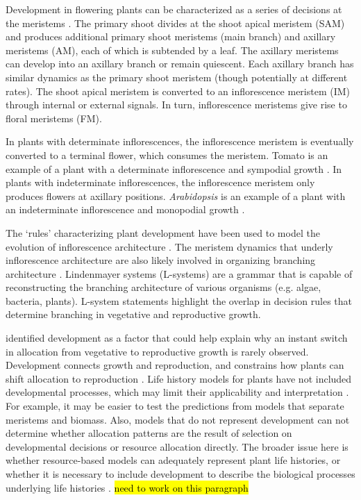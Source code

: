 \documentclass[12pt, oneside,titlepage]{article}   	%
\begin{document}
Development in flowering plants can be characterized as a series of decisions at the meristems \cite{kellogg2000}. The primary shoot divides at the shoot apical meristem (SAM) and produces additional primary shoot meristems (main branch) and axillary meristems (AM), each of which is subtended by a leaf. The axillary meristems can develop into an axillary branch or remain quiescent. Each axillary branch has similar dynamics as the primary shoot meristem (though potentially at different rates). The shoot apical meristem is converted to an inflorescence meristem (IM) through internal or external signals. In turn, inflorescence meristems give rise to floral meristems (FM). 

In plants with determinate inflorescences, the inflorescence meristem is eventually converted to a terminal flower, which consumes the meristem. Tomato is an example of a plant with a determinate inflorescence and sympodial growth \cite{park2012}. In plants with indeterminate inflorescences, the inflorescence meristem only produces flowers at axillary positions. \textit{Arabidopsis} is an example of a plant with an indeterminate inflorescence and monopodial growth \cite{bradley1997}. 

The `rules' characterizing plant development have been used to model the evolution of inflorescence architecture \cite{prusinkiewicz2007}. The meristem dynamics that underly inflorescence architecture are also likely involved in organizing branching architecture \cite{park2012}. Lindenmayer systems (L-systems) are a grammar that is capable of reconstructing the branching architecture of various organisms (e.g. algae, bacteria, plants). L-system statements highlight the overlap in decision rules that determine branching in vegetative and reproductive growth. 

\cite{cohen1971} identified development as a factor that could help explain why an instant switch in allocation from vegetative to reproductive growth is rarely observed. Development connects growth and reproduction, and constrains how plants can shift allocation to reproduction \cite{fox1992a}. Life history models for plants have not included developmental processes, which may limit their applicability and interpretation \cite{fox1992a}. For example, it may be easier to test the predictions from models that separate meristems and biomass. Also, models that do not represent development can not determine whether allocation patterns are the result of selection on developmental decisions or resource allocation directly. The broader issue here is whether resource-based models can adequately represent plant life histories, or whether it is necessary to include development to describe the biological processes underlying life histories \cite{fox1992a}. \hl{need to work on this paragraph}
\end{document}
